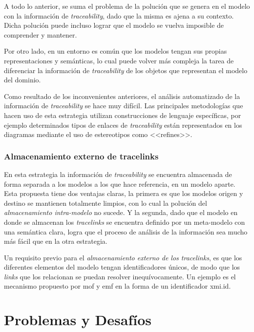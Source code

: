 \documentclass[a4paper,12pt,twoside,spanish,openright]{book}
\begin{document}
A todo lo anterior, se suma el problema de la polución que se genera en el modelo con la información de \textit{traceability}, dado que la misma es ajena a su contexto. Dicha polución puede incluso lograr que el modelo se vuelva imposible de comprender y mantener.

Por otro lado, en un entorno  es común que los modelos tengan sus propias representaciones y semánticas, lo cual puede volver más compleja la tarea de diferenciar la información de \textit{traceability} de los objetos que representan el modelo del dominio.

Como resultado de los inconvenientes anteriores, el análisis automatizado de la información de \textit{traceability} se hace muy difícil. Las principales metodologías que hacen uso de esta estrategia utilizan construcciones de lenguaje específicas, por ejemplo determinados tipos de enlaces de \textit{traceability} están representados en los diagramas  mediante el uso de estereotipos como \textsf{<<refines>>}.

\subsection{Almacenamiento externo de tracelinks}

En esta estrategia la información de \textit{traceability} se encuentra almacenada de forma separada a los modelos a los que hace referencia, en un modelo aparte. Esta propuesta tiene dos ventajas claras, la primera es que los modelos origen y destino se mantienen totalmente limpios, con lo cual la polución del \textit{almacenamiento intra-modelo} no sucede. Y la segunda, dado que el modelo en donde se almacenan los \textit{tracelinks} se encuentra definido por un meta-modelo con una semántica clara, logra que el proceso de análisis de la información sea mucho más fácil que en la otra estrategia.

Un requisito previo para el \textit{almacenamiento externo de los tracelinks}, es que los diferentes elementos del modelo tengan identificadores únicos, de modo que los \textit{links} que los relacionan se puedan resolver inequívocamente. Un ejemplo es el mecanismo propuesto por \gls{mof} y \gls{emf} en la forma de un identificador \textsf{xmi.id}.




\chapter{Problemas y Desafíos}
\label{cap:ProblemasDesafios}
\end{document}
